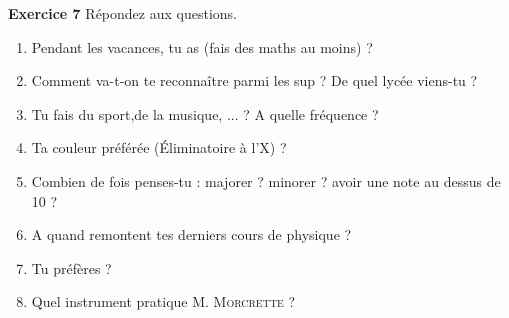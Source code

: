 \documentclass[french,bookmarks]{article}
\begin{document}
    \vspace{2mm}
    \noindent \textbf{Exercice 7} Répondez aux questions.
    
    \begin{enumerate}
        \item Pendant les vacances, tu as (fais des maths au moins) ? \enspace\hrulefill \\
        \text{}\enspace\hrulefill
        
        \item Comment va-t-on te reconnaître parmi les sup ? De quel lycée viens-tu ?\enspace\hrulefill  \\
        \text{}\enspace\hrulefill
        
        \item Tu fais du sport,de la musique, ... ? A quelle fréquence ? \enspace\hrulefill \\
        \text{}\enspace\hrulefill
        
        \item Ta couleur préférée (Éliminatoire à l'X) ? \enspace\hrulefill 
        
        \item Combien de fois penses-tu : majorer ? minorer ? avoir une note au dessus de 10 ? \enspace\hrulefill\\
        \text{}\enspace\hrulefill
        
        \item A quand remontent tes derniers cours de physique ?  \hfill {} \hfill {} \hfill\text{}
        
        \item Tu préfères ? \quad {} \hfill {} \hfill {} \hfill {} \hfill {}\qquad\text{}
        
        \item Quel instrument pratique M. \textsc{Morcrette} ? \enspace\hrulefill
        

\end{enumerate}
\end{document}
